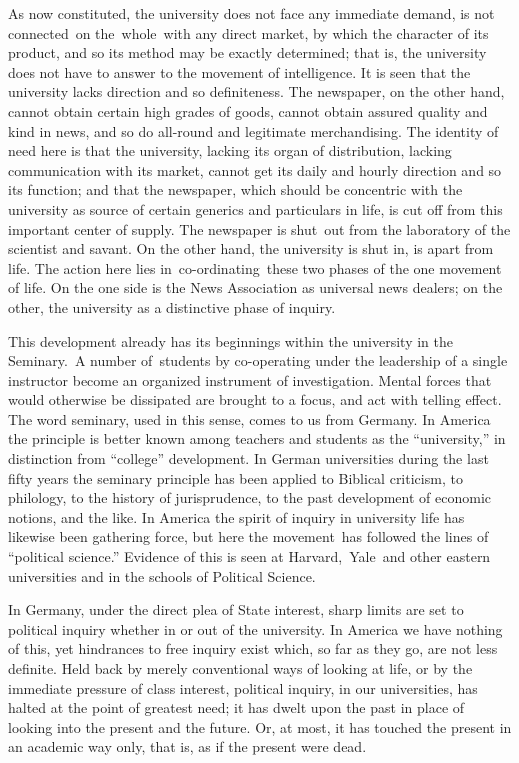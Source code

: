 \documentclass[twoside,symmetric,nobib,justified]{tufte-book}
\begin{document}
As now constituted, the university does not face any immediate demand,
is not connected~on the~whole~with any direct market, by which the
character of its product, and so its method may be exactly determined;
that is, the university does not have to answer to the movement of
intelligence. It is seen that the university lacks direction and so
definiteness. The newspaper, on the other hand, cannot obtain certain
high grades of goods, cannot obtain assured quality and kind in news,
and so do all-round and legitimate merchandising. The identity of need
here is that the university, lacking its organ of distribution, lacking
communication with its market, cannot get its daily and hourly direction
and so its function; and that the newspaper, which should be concentric
with the university as source of certain generics and particulars in
life, is cut off from this important center of supply. The newspaper is
shut~out from the laboratory of the scientist and savant. On the other
hand, the university is shut in, is apart from life. The action here
lies in~co-ordinating~these two phases of the one movement of life. On
the one side is the News Association as universal news dealers; on the
other, the university as a distinctive phase of inquiry.~

This development already has its beginnings within the university in the
Seminary.~A number of~students by co-operating under the leadership of a
single instructor become an organized instrument of investigation.
Mental forces that would otherwise be dissipated are brought to a focus,
and act with telling effect. The word seminary, used in this sense,
comes to us from Germany. In America the principle is better known among
teachers and students as the ``university,'' in distinction from
``college'' development. In German universities during the last fifty
years the seminary principle has been applied to Biblical criticism, to
philology, to the history of jurisprudence, to the past development of
economic notions, and the like. In America the spirit of inquiry in
university life has likewise been gathering force, but here the
movement~has followed the lines of ``political science.'' Evidence of
this is seen at Harvard,~Yale~and other eastern universities and in the
schools of Political Science.~

In Germany, under the direct plea of State interest, sharp limits are
set to political inquiry whether in or out of the university. In America
we have nothing of this, yet hindrances to free inquiry exist which, so
far as they go, are not less definite. Held back by merely conventional
ways of looking at life, or by the immediate pressure of class interest,
political inquiry, in our universities, has halted at the point of
greatest need; it has dwelt upon the past in place of looking into the
present and the future. Or, at most, it has touched the present in an
academic way only, that is, as if the present were dead.~
\end{document}
